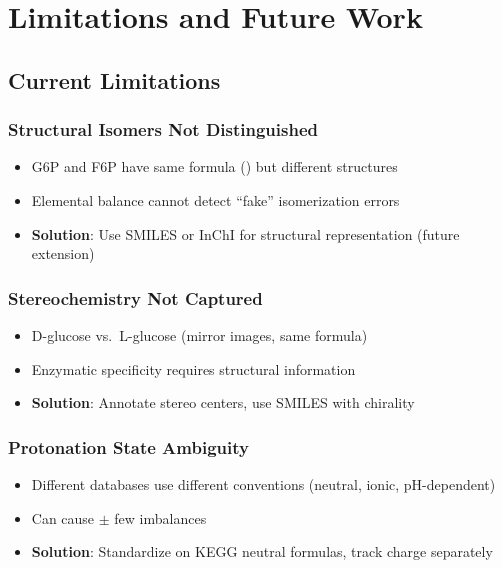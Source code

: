 \section{Limitations and Future Work}
\label{sec:formula-limitations}

\subsection{Current Limitations}
\label{subsec:current-limitations}

\subsubsection{Structural Isomers Not Distinguished}

\begin{itemize}
    \item G6P and F6P have same formula () but different structures
    \item Elemental balance cannot detect ``fake'' isomerization errors
    \item \textbf{Solution}: Use SMILES or InChI for structural representation (future extension)
\end{itemize}

\subsubsection{Stereochemistry Not Captured}

\begin{itemize}
    \item D-glucose vs.\ L-glucose (mirror images, same formula)
    \item Enzymatic specificity requires structural information
    \item \textbf{Solution}: Annotate stereo centers, use SMILES with chirality
\end{itemize}

\subsubsection{Protonation State Ambiguity}

\begin{itemize}
    \item Different databases use different conventions (neutral, ionic, pH-dependent)
    \item Can cause $\pm$ few  imbalances
    \item \textbf{Solution}: Standardize on KEGG neutral formulas, track charge separately
\end{itemize}

